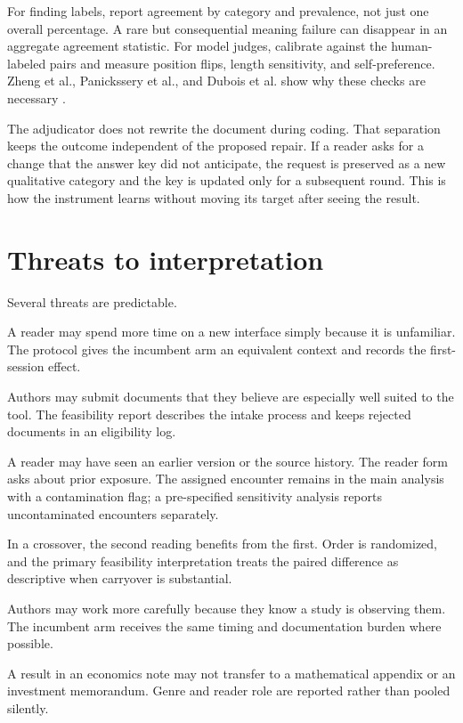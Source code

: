 For finding labels, report agreement by category and prevalence, not just one
overall percentage. A rare but consequential meaning failure can disappear in
an aggregate agreement statistic. For model judges, calibrate against the
human-labeled pairs and measure position flips, length sensitivity, and
self-preference. Zheng et al., Panickssery et al., and Dubois et al. show why
these checks are necessary \citep{zheng2023judging,panickssery2024llm,
dubois2024length}.

The adjudicator does not rewrite the document during coding. That separation
keeps the outcome independent of the proposed repair. If a reader asks for a
change that the answer key did not anticipate, the request is preserved as a
new qualitative category and the key is updated only for a subsequent round.
This is how the instrument learns without moving its target after seeing the
result.

\section{Threats to interpretation}
\label{sec:eval-threats}

Several threats are predictable.

\begin{description}[style=nextline,leftmargin=37mm,labelindent=0mm]
\item[Novelty] A reader may spend more time on a new interface simply because
it is unfamiliar. The protocol gives the incumbent arm an equivalent context
and records the first-session effect.
\item[Selection] Authors may submit documents that they believe are especially
well suited to the tool. The feasibility report describes the intake process
and keeps rejected documents in an eligibility log.
\item[Contamination] A reader may have seen an earlier version or the source
history. The reader form asks about prior exposure. The assigned encounter
remains in the main analysis with a contamination flag; a pre-specified
sensitivity analysis reports uncontaminated encounters separately.
\item[Learning] In a crossover, the second reading benefits from the first.
Order is randomized, and the primary feasibility interpretation treats the
paired difference as descriptive when carryover is substantial.
\item[Hawthorne effect] Authors may work more carefully because they know a
study is observing them. The incumbent arm receives the same timing and
documentation burden where possible.
\item[Domain mismatch] A result in an economics note may not transfer to a
mathematical appendix or an investment memorandum. Genre and reader role are
reported rather than pooled silently.
\end{description}

